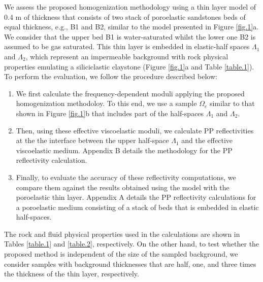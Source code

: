 \documentclass[draft]{agujournal2019}
\begin{document}
We assess the proposed homogenization methodology using a thin layer model of 0.4 m  of thickness that consists of two stack of poroelastic  sandstones beds of equal thickness, e.g., B1 and B2, similar to the model presented in Figure \ref{fig.1}a. We consider that the upper bed B1 is water-saturated whilst the lower one B2 is assumed to be gas saturated. This thin layer is embedded 
in elastic-half spaces $\Lambda_1$ and $\Lambda_2$, which represent an impermeable background  with rock physical properties emulating a siliciclastic claystone (Figure \ref{fig.1}a and Table \ref{table.1}). To perform the evaluation, we follow the procedure described below: 
\begin{enumerate}
    \item We first calculate the frequency-dependent moduli applying the proposed homogenization methodoloy. To this end, we use a sample $\Omega_e$ similar to that shown in Figure \ref{fig.1}b that includes part of the half-spaces $\Lambda_1$ and $\Lambda_2$. 
    
    \item Then, using these effective viscoelastic moduli, we calculate PP reflectivities  at the the interface between the upper half-space $\Lambda_1$ and the effective viscoelastic medium. Appendix B details the methodology for the PP reflectivity calculation.
    
    \item  Finally, to evaluate the accuracy of these reflectivity computations, we compare them against the results obtained using the model with the poroelastic thin layer. Appendix A details the PP reflectivity calculations for a poroelastic medium consisting of a stack of beds that is embedded in elastic half-spaces.
\end{enumerate}

The rock and fluid physical properties used in the calculations are shown in Tables \ref{table.1} and \ref{table.2}, respectively. On the other hand, to test whether the proposed method is independent of the size of the sampled background, we consider samples with background thicknesses that are half, one, and three times the thickness of the thin layer, respectively.
\end{document}

